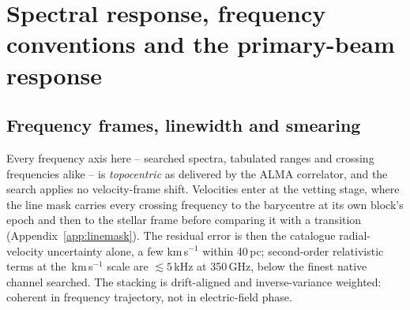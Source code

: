 \section{Spectral response, frequency conventions and the primary-beam
response}
\label{app:conventions}


\subsection{Frequency frames, linewidth and smearing}

Every frequency axis here -- searched spectra, tabulated ranges and
crossing frequencies alike -- is \emph{topocentric} as delivered by the
ALMA correlator, and the search applies no velocity-frame shift.
Velocities enter at the vetting stage, where the line mask carries every
crossing frequency to the barycentre at its own block's epoch and then to the
stellar frame before comparing it with a transition
(Appendix~\ref{app:linemask}). The residual error is then the catalogue
radial-velocity uncertainty alone, a few km\,s$^{-1}$ within 40\,pc;
second-order relativistic terms at the \MaskHalfKms\,km\,s$^{-1}$
scale are $\lesssim5$\,kHz at 350\,GHz, below the finest native channel
searched. The stacking is drift-aligned and inverse-variance weighted:
coherent in frequency trajectory, not in electric-field phase.

